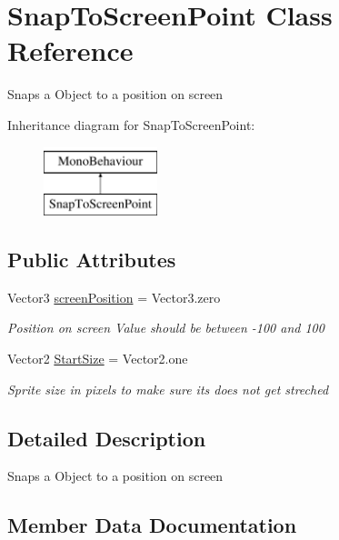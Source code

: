 \hypertarget{class_snap_to_screen_point}{}\section{Snap\+To\+Screen\+Point Class Reference}
\label{class_snap_to_screen_point}


Snaps a Object to a position on screen  


Inheritance diagram for Snap\+To\+Screen\+Point\+:\begin{figure}[H]
\begin{center}
\leavevmode
\includegraphics[height=2.000000cm]{class_snap_to_screen_point}
\end{center}
\end{figure}
\subsection*{Public Attributes}
\begin{DoxyCompactItemize}
\item 
Vector3 \hyperlink{class_snap_to_screen_point_af16a0e4b3b605f83f8382f759b7e2ef4}{screen\+Position} = Vector3.\+zero
\begin{DoxyCompactList}\small\item\em Position on screen Value should be between -\/100 and 100 \end{DoxyCompactList}\item 
Vector2 \hyperlink{class_snap_to_screen_point_a1c894fdec5879ad749eb2a0fb86c4637}{Start\+Size} = Vector2.\+one
\begin{DoxyCompactList}\small\item\em Sprite size in pixels to make sure it\textquotesingle{}s does not get streched \end{DoxyCompactList}\end{DoxyCompactItemize}


\subsection{Detailed Description}
Snaps a Object to a position on screen 



\subsection{Member Data Documentation}
